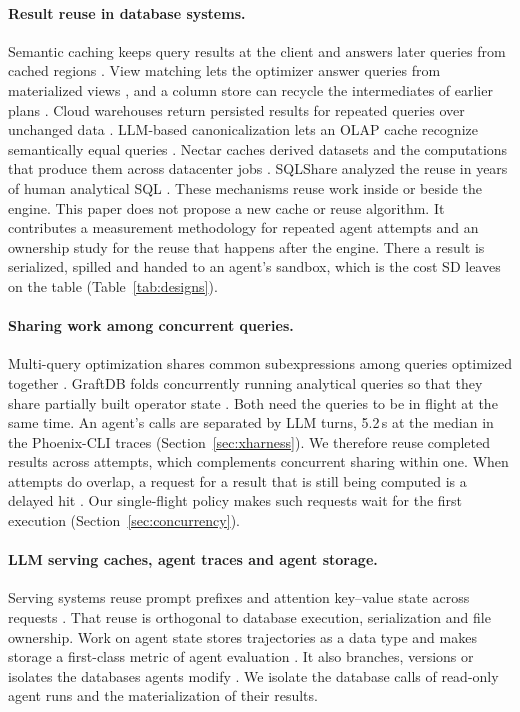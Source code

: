 \paragraph{Result reuse in database systems.}
Semantic caching keeps query results at the client and answers later queries from cached regions
\cite{dar1996semantic}. View matching lets the optimizer answer queries from materialized views
\cite{goldstein2001materialized}, and a column store can recycle the intermediates of earlier plans
\cite{ivanova2009recycling}. Cloud warehouses return persisted results for repeated queries over unchanged data
\cite{snowflake2026persisted,google2026bqcache,databricks2026querycache}. LLM-based canonicalization lets an OLAP
cache recognize semantically equal queries \cite{bindschaedler2026semantic}. Nectar caches derived datasets and the
computations that produce them across datacenter jobs \cite{gunda2010nectar}. SQLShare analyzed the reuse in years
of human analytical SQL \cite{jain2016sqlshare}. These mechanisms reuse work inside or beside the engine. This paper
does not propose a new cache or reuse algorithm. It contributes a measurement methodology for repeated agent
attempts and an ownership study for the reuse that happens after the engine. There a result is serialized, spilled
and handed to an agent's sandbox, which is the cost SD leaves on the table (Table~\ref{tab:designs}).

\paragraph{Sharing work among concurrent queries.}
Multi-query optimization shares common subexpressions among queries optimized together \cite{sellis1988mqo}. GraftDB
folds concurrently running analytical queries so that they share partially built operator state
\cite{kimura2026graftdb}. Both need the queries to be in flight at the same time. An agent's calls are separated by
LLM turns, 5.2\,s at the median in the Phoenix-CLI traces (Section~\ref{sec:xharness}). We therefore reuse completed
results across attempts, which complements concurrent sharing within one. When attempts do overlap, a request for a
result that is still being computed is a delayed hit \cite{keren2026delayedhits}. Our single-flight policy makes
such requests wait for the first execution (Section~\ref{sec:concurrency}).

\paragraph{LLM serving caches, agent traces and agent storage.}
Serving systems reuse prompt prefixes and attention key--value state across requests
\cite{zheng2024sglang,kwon2023pagedattention}. That reuse is orthogonal to database execution, serialization and
file ownership. Work on agent state stores trajectories as a data type \cite{zheng2026trajectorydb} and makes
storage a first-class metric of agent evaluation \cite{yu2026footprint}. It also branches, versions or isolates the
databases agents modify \cite{ang2026branchbench,gou2026git4data,zhou2026atcc,zhou2026chronos}. We isolate the database calls of read-only agent runs and the materialization of their results.
